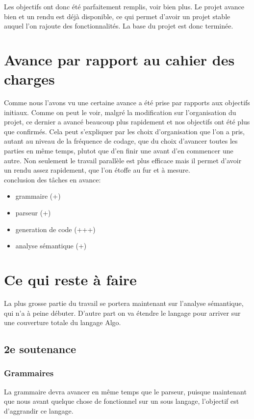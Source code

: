 \documentclass[12pt,a4paper]{report}
\begin{document}
Les objectifs ont donc été parfaitement remplis, voir bien plus. Le projet avance bien et un rendu est déjà disponible, ce qui permet d'avoir un projet stable auquel l'on rajoute des fonctionnalités. La base du projet est donc terminée.
\newpage

\section{Avance par rapport au cahier des charges}
Comme nous l'avons vu une certaine avance a été prise par rapports aux objectifs initiaux.
Comme on peut le voir, malgré la modification sur l'organisation du projet, ce dernier a avancé beaucoup plus rapidement et nos objectifs ont été plus que confirmés. Cela peut s'expliquer par les choix d'organisation que l'on a pris, autant au niveau de la fréquence de codage, que du choix d'avancer toutes les parties en même temps, plutot que d'en finir une avant d'en commencer une autre. Non seulement le travail parallèle est plus efficace mais il permet d'avoir un rendu assez rapidement, que l'on étoffe au fur et à mesure. \\

conclusion des tâches en avance:
\begin{itemize}
\item grammaire (+)
\item parseur (+)
\item generation de code (+++)
\item analyse sémantique (+)
\end{itemize}

\section{Ce qui reste à faire}

La plus grosse partie du travail se portera maintenant sur l'analyse sémantique, qui n'a à peine débuter. D'autre part on va étendre le langage pour arriver sur une couverture totale du langage Algo.

\subsection{2e soutenance}
\subsubsection{Grammaires}
La grammaire devra avancer en même temps que le parseur, puisque maintenant que nous avant quelque chose de fonctionnel sur un sous langage, l'objectif est d'aggrandir ce langage.
\end{document}
